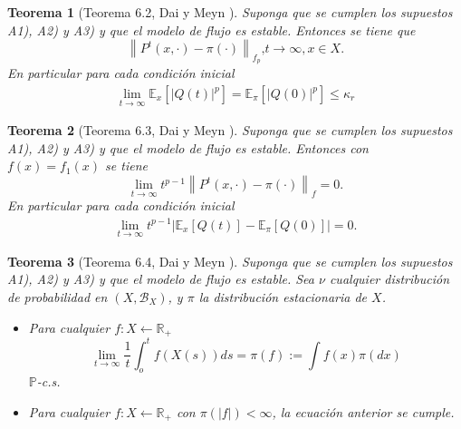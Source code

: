 \documentclass{article}
\newtheorem{Teo}{Teorema}
\newcommand{\rea}{\mathbb{R}}
\newcommand{\esp}{\mathbb{E}}
\newcommand{\prob}{\mathbb{P}}
\begin{document}
\begin{Teo}[Teorema 6.2, Dai y Meyn \cite{DaiSean}]\label{Tma.6.2.DaiSean}
Suponga que se cumplen los supuestos A1), A2) y A3) y que el
modelo de flujo es estable. Entonces se tiene que
\begin{equation}
\left\|P^{t}\left(x,\cdot\right)-\pi\left(\cdot\right)\right\|_{f_{p}}\textrm{,
}t\rightarrow\infty,x\in X.
\end{equation}
En particular para cada condici\'on inicial
\begin{eqnarray*}
\lim_{t\rightarrow\infty}\esp_{x}\left[|Q\left(t\right)|^{p}\right]=\esp_{\pi}\left[|Q\left(0\right)|^{p}\right]\leq\kappa_{r}
\end{eqnarray*}
\end{Teo}
\begin{Teo}[Teorema 6.3, Dai y Meyn \cite{DaiSean}]\label{Tma.6.3.DaiSean}
Suponga que se cumplen los supuestos A1), A2) y A3) y que el
modelo de flujo es estable. Entonces con
$f\left(x\right)=f_{1}\left(x\right)$ se tiene
\begin{equation}
\lim_{t\rightarrow\infty}t^{p-1}\left\|P^{t}\left(x,\cdot\right)-\pi\left(\cdot\right)\right\|_{f}=0.
\end{equation}
En particular para cada condici\'on inicial
\begin{eqnarray*}
\lim_{t\rightarrow\infty}t^{p-1}|\esp_{x}\left[Q\left(t\right)\right]-\esp_{\pi}\left[Q\left(0\right)\right]|=0.
\end{eqnarray*}
\end{Teo}

\begin{Teo}[Teorema 6.4, Dai y Meyn \cite{DaiSean}]\label{Tma.6.4.DaiSean}
Suponga que se cumplen los supuestos A1), A2) y A3) y que el
modelo de flujo es estable. Sea $\nu$ cualquier distribuci\'on de
probabilidad en $\left(X,\mathcal{B}_{X}\right)$, y $\pi$ la
distribuci\'on estacionaria de $X$.
\begin{itemize}
\item[i)] Para cualquier $f:X\leftarrow\rea_{+}$
\begin{equation}
\lim_{t\rightarrow\infty}\frac{1}{t}\int_{o}^{t}f\left(X\left(s\right)\right)ds=\pi\left(f\right):=\int
f\left(x\right)\pi\left(dx\right)
\end{equation}
$\prob$-c.s.

\item[ii)] Para cualquier $f:X\leftarrow\rea_{+}$ con
$\pi\left(|f|\right)<\infty$, la ecuaci\'on anterior se cumple.
\end{itemize}
\end{Teo}
\end{document}
